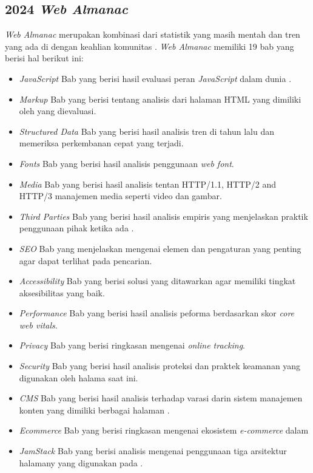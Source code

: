 \subsection{2024 \textit{Web Almanac}}
\label{subsec:almanac}

\textit{Web Almanac} merupakan kombinasi dari statistik yang masih mentah dan tren yang ada di \http dengan keahlian komunitas \web. \textit{Web Almanac} memiliki 19 bab yang berisi hal berikut ini:
\begin{itemize}
    \item \textit{JavaScript} Bab yang berisi hasil evaluasi peran \textit{JavaScript} dalam dunia \web. 
    \item \textit{Markup} Bab yang berisi tentang analisis dari halaman HTML yang dimiliki oleh \web yang dievaluasi.
    \item \textit{Structured Data} Bab yang berisi hasil analisis tren di tahun lalu dan memeriksa perkembanan cepat yang terjadi.
    \item \textit{Fonts} Bab yang berisi hasil analisis penggunaan \textit{web font}.
    \item \textit{Media} Bab yang berisi hasil analisis tentan HTTP/1.1, HTTP/2 and HTTP/3 manajemen media seperti video dan gambar.
    \item \textit{Third Parties} Bab yang berisi hasil analisis empiris yang menjelaskan praktik penggunaan pihak ketika ada \web.
    \item \textit{SEO} Bab yang menjelaskan mengenai elemen dan pengaturan yang penting agar \web dapat terlihat pada pencarian.
    \item \textit{Accessibility} Bab yang berisi solusi yang ditawarkan agar memiliki tingkat aksesibilitas yang baik.
    \item \textit{Performance} Bab yang berisi hasil analisis peforma berdasarkan skor \textit{core web vitals}.
    \item \textit{Privacy} Bab yang berisi ringkasan mengenai \textit{online tracking}. 
    \item \textit{Security} Bab yang berisi hasil analisis proteksi dan praktek keamanan yang digunakan oleh halama \web saat ini.
    \item \textit{CMS} Bab yang berisi hasil analisis terhadap varasi darin sistem manajemen konten yang dimiliki berbagai halaman \web.
    \item \textit{Ecommerce} Bab yang berisi ringkasan mengenai ekosistem \textit{e-commerce} dalam \web 
    \item \textit{JamStack} Bab yang berisi analisis mengenai penggunaan tiga arsitektur halamany yang digunakan pada \web.

\end{itemize}
